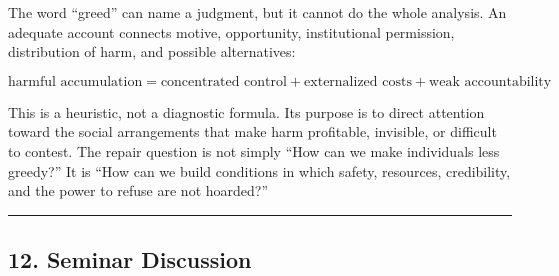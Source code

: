 \documentclass[
  11pt,
  letterpaper,
]{article}
\begin{document}
The word ``greed'' can name a judgment, but it cannot do the whole
analysis. An adequate account connects motive, opportunity,
institutional permission, distribution of harm, and possible
alternatives:

\[
\text{harmful accumulation}
= \text{concentrated control}
+ \text{externalized costs}
+ \text{weak accountability}
\]

This is a heuristic, not a diagnostic formula. Its purpose is to direct
attention toward the social arrangements that make harm profitable,
invisible, or difficult to contest. The repair question is not simply
``How can we make individuals less greedy?'' It is ``How can we build
conditions in which safety, resources, credibility, and the power to
refuse are not hoarded?''

\begin{center}\rule{0.5\linewidth}{0.5pt}\end{center}

\subsection{12. Seminar Discussion}\label{seminar-discussion}
\end{document}
